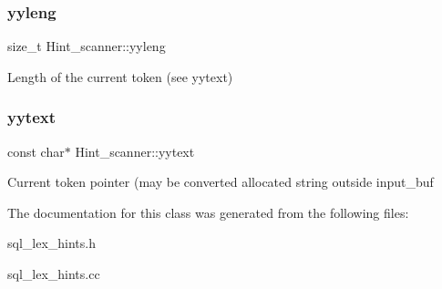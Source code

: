 \subsubsection{\texorpdfstring{yyleng}{yyleng}}
{\footnotesize\ttfamily size\+\_\+t Hint\+\_\+scanner\+::yyleng}

Length of the current token (see yytext) \mbox{\label{classHint__scanner_a859fc3f9da20043fc962f81a75b25587}} 
\subsubsection{\texorpdfstring{yytext}{yytext}}
{\footnotesize\ttfamily const char$\ast$ Hint\+\_\+scanner\+::yytext}

Current token pointer (may be converted allocated string outside input\+\_\+buf 

The documentation for this class was generated from the following files\+:\begin{DoxyCompactItemize}
\item 
sql\+\_\+lex\+\_\+hints.\+h\item 
sql\+\_\+lex\+\_\+hints.\+cc\end{DoxyCompactItemize}

